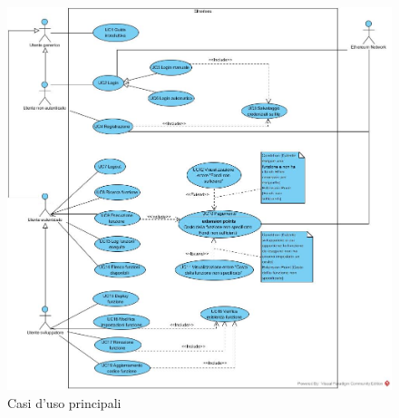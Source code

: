 \begin{figure}[h]
	\centering
	\includegraphics[width=12.3cm]{res/img/useCaseDiagram.jpg}
	\caption{Casi d'uso principali}
\end{figure}
\newpage


\newpage


























\newpage







\newpage






